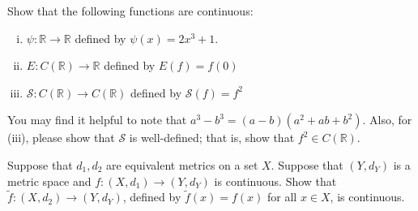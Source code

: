 \documentclass[11pt,letterpaper]{article}
\newcommand{\R}{\mathbb{R}}
\newcommand{\cS}{\mathcal S}
\newenvironment{prob}[1]
  {\renewcommand\theinnerprob{#1}\innerprob}
  {\endinnerprob}
\newenvironment{solution}
  {\renewcommand\qedsymbol{}\begin{proof}[Solution]}
  {\end{proof}\bigskip}
\begin{document}
\begin{prob}{7}  %
Show that the following functions are continuous:
\begin{enumerate}[(i)]

	\item $\psi: \R \to \R$ defined by $\psi(x) = 2x^3 + 1$.
	
	\item $E: C(\R) \to \R$ defined by $E(f) = f(0)$

	\item $\cS: C(\R) \to C(\R)$ defined by $\cS(f) = f^2$
	
\end{enumerate}
You may find it helpful to note that $a^3 - b^3 = (a-b) (a^2 + ab + b^2)$.  Also, for (iii), please show that $\cS$ is well-defined; that is, show that $f^2 \in C(\R)$.
\end{prob}





\begin{prob}{8}  %
	Suppose that $d_1, d_2$ are equivalent metrics on a set $X$.  Suppose that $(Y,d_Y)$ is a metric space and $f: (X,d_1) \to (Y, d_Y)$ is continuous.  Show that $\tilde f: (X,d_2) \to (Y,d_Y)$, defined by $\tilde f(x) = f(x)$ for all $x\in X$, is continuous.
\end{prob}
\end{document}
